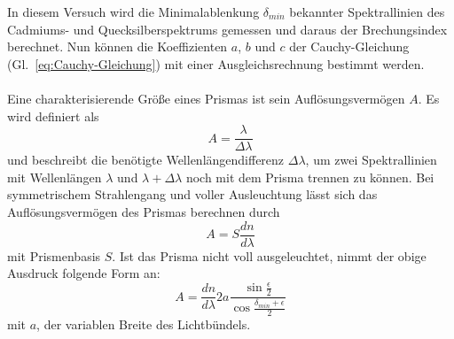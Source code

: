 \documentclass[12pt,a4paper]{article}
\begin{document}
In diesem Versuch wird die Minimalablenkung $\delta_{min}$ bekannter Spektrallinien des Cadmiums- und Quecksilberspektrums gemessen und daraus der Brechungsindex berechnet. Nun können die Koeffizienten $a$, $b$ und $c$ der Cauchy-Gleichung (Gl.~\eqref{eq:Cauchy-Gleichung}) mit einer Ausgleichsrechnung bestimmt werden.\\\\
Eine charakterisierende Größe eines Prismas ist sein Auflösungsvermögen $A$. Es wird definiert als 
\begin{equation}
A=\frac{\lambda}{\Delta\lambda}
\end{equation}
und beschreibt die benötigte Wellenlängendifferenz $\Delta\lambda$, um zwei Spektrallinien mit Wellenlängen $\lambda$ und $\lambda+\Delta\lambda$ noch mit dem Prisma trennen zu können. Bei symmetrischem Strahlengang und voller Ausleuchtung lässt sich das Auflösungsvermögen des Prismas berechnen durch
\begin{equation}
A=S\frac{dn}{d\lambda}
\end{equation}
mit Prismenbasis $S$. Ist das Prisma nicht voll ausgeleuchtet, nimmt der obige Ausdruck folgende Form an:
\begin{equation}
	A=\frac{dn}{d\lambda}2a\frac{\sin\frac{\epsilon}{2}}{\cos\frac{\delta_{min}+\epsilon}{2}}
\end{equation}
mit $a$, der variablen Breite des Lichtbündels.
\end{document}
